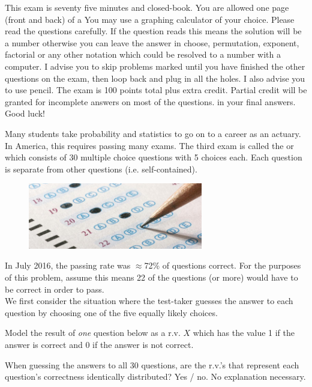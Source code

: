 \documentclass[12pt]{article}
\begin{document}
This exam is seventy five minutes and closed-book. You are allowed one page (front and back) of a  You may use a graphing calculator of your choice. Please read the questions carefully. If the question reads  this means the solution will be a number otherwise you can leave the answer in choose, permutation, exponent, factorial or any other notation which could be resolved to a number with a computer. I advise you to skip problems marked  until you have finished the other questions on the exam, then loop back and plug in all the holes. I also advise you to use pencil. The exam is 100 points total plus extra credit. Partial credit will be granted for incomplete answers on most of the questions.  in your final answers. Good luck!

\pagebreak

\problem Many students take probability and statistics to go on to a career as an actuary. In America, this requires passing many exams. The third exam is called the  or  which consists of 30 multiple choice questions with 5 choices each. Each question is separate from other questions (i.e. self-contained).

\begin{figure}[htp]
\centering
\includegraphics[width=3in]{scantron.png}
\end{figure}

In July 2016, the passing rate was $\approx$72\% of questions correct. For the purposes of this problem, assume this means 22 of the questions (or more) would have to be correct in order to pass. \\

We first consider the situation where the test-taker guesses the answer to each question by choosing one of the five equally likely choices. 

\benum
{} Model the result of \emph{one} question below as a r.v. $X$ which has the value 1 if the answer is correct and 0 if the answer is not correct.  

 When guessing the answers to all 30 questions, are the r.v.'s that represent each question's correctness identically distributed? Yes / no. No explanation necessary.  
\end{document}
